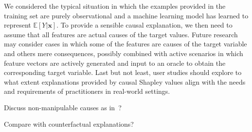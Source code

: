 \documentclass{article}
\newcommand{\vx}{\mathbf{x}}
\newcommand{\expectation}{\mathbb{E}}
\newcommand{\comment}[1]{{\color{red} #1}}
\begin{document}
We considered the typical situation in which the examples provided in the training set are purely observational and a machine learning model has learned to represent $\expectation[Y|\vx]$. To provide a sensible causal explanation, we then need to assume that all features are actual causes of the target values. Future research may consider cases in which some of the features are causes of the target variable and others mere consequences, possibly combined with active scenarios in which feature vectors are actively generated and input to an oracle to obtain the corresponding target variable. Last but not least, user studies should explore to what extent explanations provided by causal Shapley values align with the needs and requirements of practitioners in real-world settings.

\comment{Discuss non-manipulable causes as in~\cite{pearl2018obesity}?}
	


\comment{Compare with counterfactual explanations?}

%





\end{document}
